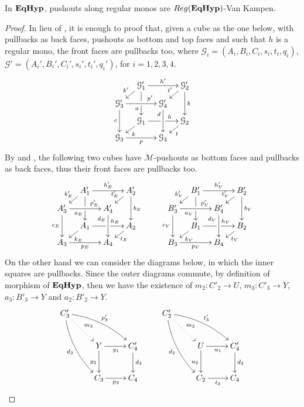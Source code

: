 \documentclass[a4paper,UKenglish,cleveref,pdftex,thm-restate,numberwithinsect]{lipics-v2021}
\def\B{\textbf {\textup{B}}}
\def\A{\textbf {\textup{A}}}
\newcommand{\catname}[1]{\textbf{\textup{#1}}}
\newcommand{\EqHyp}{\catname{EqHyp}} %
\newcommand{\reg}{\mathsf{Reg}}
\begin{document}
\begin{lemma}\label{lemma:van_kampen}
	In $\EqHyp$, pushouts along regular monos are $\reg(\EqHyp)$-Van Kampen.
\end{lemma}

\begin{proof}
	In lieu of , it is enough to proof that, given a cube as the one below, with pullbacks as back faces, pushouts as bottom and top faces and such that $h$ is a regular mono,
	the front faces are pullbacks too, where $\mathcal{G}_i = (A_i, B_i, C_i, s_i, t_i, q_i)$, $\mathcal{G}'=(A_i', B_i', C_i', s_i', t_i', q_i')$, for $i = 1, 2, 3, 4$.
	\[
	\xymatrix@C=10pt@R=6pt{&\mathcal{G}_1'\ar[dd]|\hole_(.65){a}\ar[rr]^{h'} \ar[dl]_{k'} && \mathcal{G}_2' \ar[dd]^{b} \ar[dl]_{t'} \\ \mathcal{G}_3'  \ar[dd]_{c}\ar[rr]^(.7){p'} & & \mathcal{G}_4' \ar[dd]_(.3){d}\\&\mathcal{G}_1\ar[rr]|\hole^(.65){h} \ar[dl]^{k} && \mathcal{G}_2 \ar[dl]^{t} \\\mathcal{G}_3 \ar[rr]_{p} & & \mathcal{G}_4 }
	\]
	By  and , the following two cubes have $\mathcal{M}$-pushouts as bottom faces and pullbacks as back faces,
	thus their front faces are pullbacks too.
	\[
	\xymatrix@C=10pt@R=6pt{&A_1'\ar[dd]|\hole_(.65){a_E}\ar[rr]^{h_E'} \ar[dl]_{k_E'} && A_2' \ar[dd]^{b_E} \ar[dl]_{t_E'} \\ A_3'  \ar[dd]_{c_E}\ar[rr]^(.7){p_E'} & & A_4' \ar[dd]_(.3){d_E}\\&A_1\ar[rr]|\hole^(.65){h_E} \ar[dl]^{k_E} && A_2 \ar[dl]^{t_E} \\A_3 \ar[rr]_{p_E} & & A_4 }
	\qquad
	\xymatrix@C=10pt@R=6pt{&B_1'\ar[dd]|\hole_(.65){a_V}\ar[rr]^{h_V'} \ar[dl]_{k_V'} && B_2' \ar[dd]^{b_V} \ar[dl]_{t_V'} \\ B_3'  \ar[dd]_{c_V}\ar[rr]^(.7){p_V'} & & B_4' \ar[dd]_(.3){d_V}\\&B_1\ar[rr]|\hole^(.65){h_V} \ar[dl]^{k_V} && B_2 \ar[dl]^{t_V} \\B_3 \ar[rr]_{p_V} & & B_4 }
	\]
	On the other hand we can consider the diagrams below, in which the inner squares are pullbacks.
	Since the outer diagrams commute, by definition of morphism of $\EqHyp$, then we have the existence of $m_2\colon C'_2\to U$, $m_3\colon C'_3\to Y $, $a_3\colon B'_3\to Y$ and $a_2\colon B'_2\to Y$.
	\[\xymatrix{C'_3 \ar@{.>}[dr]^{m_3} \ar@/^.3cm/[drr]^{p'_3} \ar@/_.3cm/[ddr]_{d_3} &&& C'_2 \ar@{.>}[dr]^{m_2} \ar@/^.3cm/[drr]^{t'_3} \ar@/_.3cm/[ddr]_{d_2}\\&Y \ar[r]_{y_1} \ar[d]_{y_2}& C'_4\ar[d]^{d_3}&& U \ar[d]_{u_2}\ar[r]_{u_1}& C'_4 \ar[d]^{d_3}\\&C_3 \ar[r]_{p_3}& C_4 &&C_2 \ar[r]_{t_3}& C_4 }\]
	

\end{proof}
\end{document}
